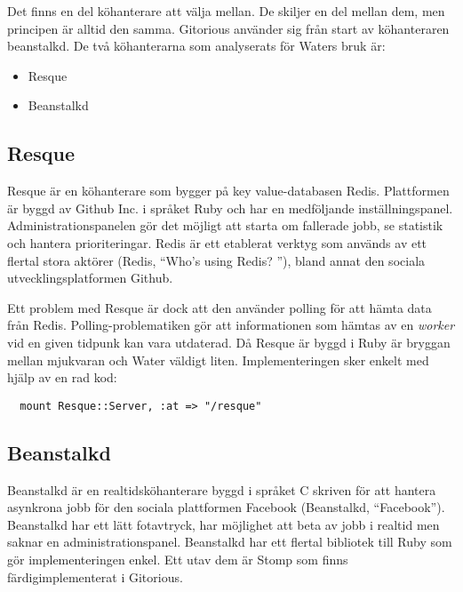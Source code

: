 Det finns en del köhanterare att välja mellan. De skiljer en del mellan dem, men principen är alltid den samma. Gitorious använder sig från start av köhanteraren beanstalkd.
De två köhanterarna som analyserats för Waters bruk är:

\begin{itemize}
  \item Resque
  \item Beanstalkd
\end{itemize}

\subsection{Resque}

Resque är en köhanterare som bygger på key value-databasen Redis. Plattformen
är byggd av Github Inc. i språket Ruby och har en medföljande
inställningspanel. Administrationspanelen gör det möjligt att starta om
fallerade jobb, se statistik och hantera prioriteringar. Redis är ett etablerat
verktyg som används av ett flertal stora aktörer (Redis, \textquotedblleft Who's using
Redis? \textquotedblright), bland annat den sociala utvecklingsplatformen Github.

Ett problem med Resque är dock att den använder polling för att hämta data från
Redis. Polling-problematiken gör att informationen som hämtas av en \emph{worker} vid
en given tidpunk kan vara utdaterad. Då Resque är byggd i Ruby är bryggan
mellan mjukvaran och Water väldigt liten. Implementeringen sker enkelt med
hjälp av en rad kod:

\begin{verbatim}
  mount Resque::Server, :at => "/resque"
\end{verbatim}

\subsection{Beanstalkd}
Beanstalkd är en realtidsköhanterare byggd i språket C skriven för att hantera asynkrona jobb för den sociala plattformen Facebook (Beanstalkd, “Facebook”). Beanstalkd har ett lätt fotavtryck, har möjlighet att beta av jobb i realtid men saknar en administrationspanel.
Beanstalkd har ett flertal bibliotek till Ruby som gör implementeringen enkel. Ett utav dem är Stomp som finns färdigimplementerat i Gitorious.
